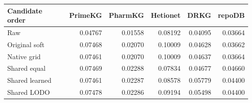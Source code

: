 \begin{tabular}{lrrrrr}
\toprule
Candidate order & PrimeKG & PharmKG & Hetionet & DRKG & repoDB \\
\midrule
Raw & 0.04767 & 0.01558 & 0.08192 & 0.04095 & 0.03664 \\
Original soft & 0.07468 & 0.02070 & 0.10009 & 0.04628 & 0.03662 \\
Native grid & 0.07461 & 0.02070 & 0.10009 & 0.04637 & 0.03664 \\
Shared equal & 0.07469 & 0.02288 & 0.07834 & 0.04677 & 0.04660 \\
Shared learned & 0.07461 & 0.02287 & 0.08578 & 0.05779 & 0.04400 \\
Shared LODO & 0.07478 & 0.02286 & 0.09194 & 0.05498 & 0.04400 \\
\bottomrule
\end{tabular}

